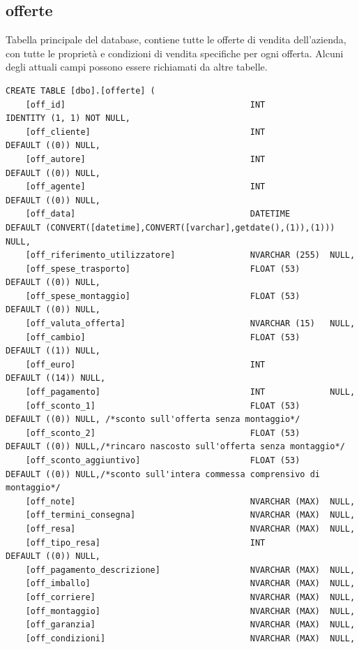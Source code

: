 \documentclass[12pt]{article}
\begin{document}
\subsection{offerte}
Tabella principale del database, contiene tutte le offerte di vendita dell'azienda, con tutte le proprietà e condizioni di vendita
specifiche per ogni offerta.
Alcuni degli attuali campi possono essere richiamati da altre tabelle.
\begin{lstlisting}
CREATE TABLE [dbo].[offerte] (
    [off_id]                                     INT             IDENTITY (1, 1) NOT NULL,
    [off_cliente]                                INT             DEFAULT ((0)) NULL,
    [off_autore]                                 INT             DEFAULT ((0)) NULL,
    [off_agente]                                 INT             DEFAULT ((0)) NULL,
    [off_data]                                   DATETIME        DEFAULT (CONVERT([datetime],CONVERT([varchar],getdate(),(1)),(1))) NULL,
    [off_riferimento_utilizzatore]               NVARCHAR (255)  NULL,
    [off_spese_trasporto]                        FLOAT (53)      DEFAULT ((0)) NULL,
    [off_spese_montaggio]                        FLOAT (53)      DEFAULT ((0)) NULL,
    [off_valuta_offerta]                         NVARCHAR (15)   NULL,
    [off_cambio]                                 FLOAT (53)      DEFAULT ((1)) NULL,
    [off_euro]                                   INT             DEFAULT ((14)) NULL,
    [off_pagamento]                              INT             NULL,
    [off_sconto_1]                               FLOAT (53)      DEFAULT ((0)) NULL, /*sconto sull'offerta senza montaggio*/
    [off_sconto_2]                               FLOAT (53)      DEFAULT ((0)) NULL,/*rincaro nascosto sull'offerta senza montaggio*/
    [off_sconto_aggiuntivo]                      FLOAT (53)      DEFAULT ((0)) NULL,/*sconto sull'intera commessa comprensivo di montaggio*/
    [off_note]                                   NVARCHAR (MAX)  NULL,
    [off_termini_consegna]                       NVARCHAR (MAX)  NULL,
    [off_resa]                                   NVARCHAR (MAX)  NULL,
    [off_tipo_resa]                              INT             DEFAULT ((0)) NULL,
    [off_pagamento_descrizione]                  NVARCHAR (MAX)  NULL,
    [off_imballo]                                NVARCHAR (MAX)  NULL,
    [off_corriere]                               NVARCHAR (MAX)  NULL,
    [off_montaggio]                              NVARCHAR (MAX)  NULL,
    [off_garanzia]                               NVARCHAR (MAX)  NULL,
    [off_condizioni]                             NVARCHAR (MAX)  NULL,

\end{lstlisting}
\end{document}
